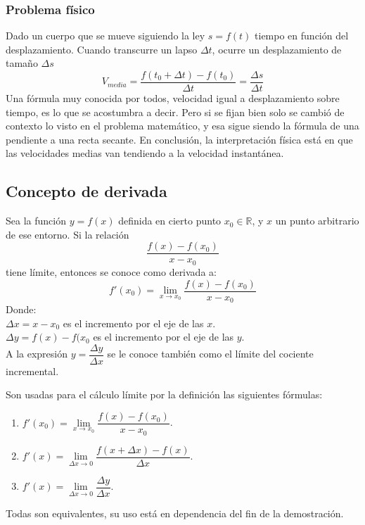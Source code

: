 \documentclass[10pt,twoside]{SelfArx} %
\begin{document}
\subsubsection{Problema físico}
Dado un cuerpo que se mueve siguiendo la ley $ s=f(t) $ tiempo en función del desplazamiento. Cuando transcurre un lapso  $ \Delta t $, ocurre un desplazamiento de tamaño $ \Delta s $
\begin{equation}
V_{media}=\dfrac{f(t_{0}+\Delta t)-f(t_{0})}{\Delta t}=\dfrac{\Delta s}{\Delta t}
\end{equation}
Una fórmula muy conocida por todos, \textsf{velocidad igual a desplazamiento sobre tiempo}, es lo que se acostumbra a decir. Pero si se fijan bien solo se cambió de contexto lo visto en el problema matemático, y esa sigue siendo la fórmula de una pendiente a una recta secante. En conclusión, la interpretación física está en que las velocidades medias van tendiendo a la velocidad instantánea.






\subsection{Concepto de derivada}

\begin{thm}
Sea la función $ y=f(x) $ definida en cierto punto $ x_{0}\in\mathbb{R} $, y $ x $ un punto arbitrario de ese entorno. Si la relación
\[ \dfrac{f(x)-f(x_{0})}{x-x_{0}} \]
tiene límite, entonces se conoce como derivada a:
\[ f'(x_{0})=\lim\limits_{x\rightarrow x_{0}}\dfrac{f(x)-f(x_{0})}{x-x_{0}} \]
Donde:\\
$ \Delta x= x-x_{0} $ es el incremento por el eje de las $ x $.\\
$ \Delta y=f(x)-f(x_{0} $ es el incremento por el eje de las $ y $.\\

A la expresión $ y=\dfrac{\Delta y}{\Delta x} $ se le conoce también como el límite del cociente incremental.
	
\end{thm}
Son usadas para el c\'alculo límite por la definición las siguientes fórmulas:
\begin{enumerate}\label{ecuaciones_derivadas}
	\item $ f'(x_{0})=\lim\limits_{x\rightarrow x_{0}}\dfrac{f(x)-f(x_{0})}{x-x_{0}} $.
	\item $ f'(x)=\lim\limits_{\Delta x\rightarrow 0}\dfrac{f(x+\Delta x)-f(x)}{\Delta x} $.
	\item $ f'(x)=\lim\limits_{\Delta x\rightarrow 0}\dfrac{\Delta y}{\Delta x} $.
\end{enumerate}
Todas son equivalentes, su uso está en dependencia del fin de la demostración.
\end{document}
